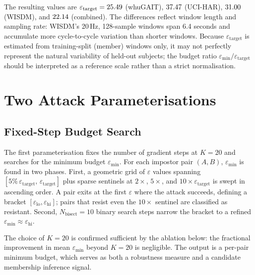 The resulting values are $\varepsilon_\text{target} = 25.49$ (whuGAIT), $37.47$ (UCI-HAR), $31.00$ (WISDM), and $22.14$ (combined). The differences reflect window length and sampling rate: WISDM's 20\,Hz, 128-sample windows span 6.4 seconds and accumulate more cycle-to-cycle variation than shorter windows. Because $\varepsilon_\text{target}$ is estimated from training-split (member) windows only, it may not perfectly represent the natural variability of held-out subjects; the budget ratio $\varepsilon_\text{min}/\varepsilon_\text{target}$ should be interpreted as a reference scale rather than a strict normalisation.

\section{Two Attack Parameterisations}
\label{sec:ev_parameterisations}

\subsection{Fixed-Step Budget Search}
\label{ssec:ev_eps_param}

The first parameterisation fixes the number of gradient steps at $K = 20$ and searches for the minimum budget $\varepsilon_\text{min}$. For each impostor pair $(A, B)$, $\varepsilon_\text{min}$ is found in two phases. First, a geometric grid of $\varepsilon$ values spanning $[5\%\,\varepsilon_\text{target},\, \varepsilon_\text{target}]$ plus sparse sentinels at $2\times$, $5\times$, and $10\times \varepsilon_\text{target}$ is swept in ascending order. A pair exits at the first $\varepsilon$ where the attack succeeds, defining a bracket $[\varepsilon_\text{lo}, \varepsilon_\text{hi}]$; pairs that resist even the $10\times$ sentinel are classified as resistant. Second, $N_\text{bisect} = 10$ binary search steps narrow the bracket to a refined $\varepsilon_\text{min} \approx \varepsilon_\text{hi}$.

The choice of $K = 20$ is confirmed sufficient by the ablation below: the fractional improvement in mean $\varepsilon_\text{min}$ beyond $K = 20$ is negligible. The output is a per-pair minimum budget, which serves as both a robustness measure and a candidate membership inference signal.

